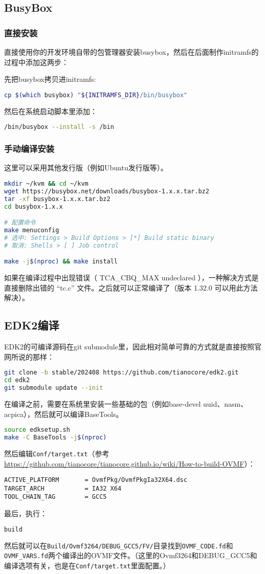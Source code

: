\subsection{BusyBox}
\subsubsection{直接安装}
直接使用你的开发环境自带的包管理器安装busybox，然后在后面制作initramfs的过程中添加这两步：

先把busybox拷贝进initramfs:
\begin{lstlisting}[language=bash]
cp $(which busybox) "${INITRAMFS_DIR}/bin/busybox"
\end{lstlisting}

然后在系统启动脚本里添加：
\begin{lstlisting}[language=bash]
/bin/busybox --install -s /bin
\end{lstlisting}
\subsubsection{手动编译安装}
这里可以采用其他发行版（例如Ubuntu发行版等）。
\begin{lstlisting}[language=bash]
mkdir ~/kvm && cd ~/kvm
wget https://busybox.net/downloads/busybox-1.x.x.tar.bz2
tar -xf busybox-1.x.x.tar.bz2
cd busybox-1.x.x

# 配置命令
make menuconfig
# 选中: Settings > Build Options > [*] Build static binary
# 取消: Shells > [ ] Job control

make -j$(nproc) && make install
\end{lstlisting}
如果在编译过程中出现错误（ TCA\_CBQ\_MAX undeclared ），一种解决方式是直接删除出错的 “tc.c” 文件。之后就可以正常编译了（版本 1.32.0 可以用此方法解决）。

\subsection{EDK2编译}
EDK2的可编译源码在git submodule里，因此相对简单可靠的方式就是直接按照官网所说的那样：
\begin{lstlisting}[language=bash]
git clone -b stable/202408 https://github.com/tianocore/edk2.git
cd edk2
git submodule update --init
\end{lstlisting}
在编译之前，需要在系统里安装一些基础的包（例如base-devel uuid、nasm、acpica），然后就可以编译BaseTools。
\begin{lstlisting}[language=bash]
source edksetup.sh
make -C BaseTools -j$(nproc)
\end{lstlisting}
然后编辑\texttt{Conf/target.txt}（参考\url{https://github.com/tianocore/tianocore.github.io/wiki/How-to-build-OVMF}）：
\begin{lstlisting}
ACTIVE_PLATFORM       = OvmfPkg/OvmfPkgIa32X64.dsc
TARGET_ARCH           = IA32 X64
TOOL_CHAIN_TAG        = GCC5
\end{lstlisting}
最后，执行：
\begin{lstlisting}[language=bash]
build
\end{lstlisting}
然后就可以在\texttt{Build/Ovmf3264/DEBUG\_GCC5/FV/}目录找到\texttt{OVMF\_CODE.fd}和\texttt{OVMF\_VARS.fd}两个编译出的OVMF文件。（这里的Ovmf3264和DEBUG\_GCC5和编译选项有关，也是在\texttt{Conf/target.txt}里面配置。）

